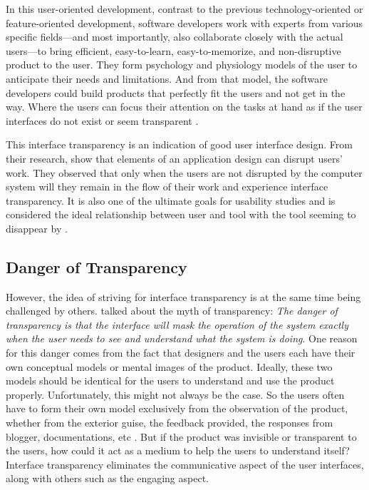 \documentclass{acm_proc_article-sp}
\begin{document}
In this user-oriented development, contrast to the previous
technology-oriented or feature-oriented development, software
developers work with experts from various specific fields---and most
importantly, also collaborate closely with the actual users---to bring
efficient, easy-to-learn, easy-to-memorize, and non-disruptive product
to the user. They form psychology and physiology models of the user to
anticipate their needs and limitations. And from that model, the
software developers could build products that perfectly fit the users
and not get in the way. Where the users can focus their attention on
the tasks at hand as if the user interfaces do not exist or seem
transparent \citep{computer:weiser}.

This interface transparency is an indication of good user interface
design. From their research, \citet{transparency:holtzblatt} show that
elements of an application design can disrupt users' work. They
observed that only when the users are not disrupted by the computer
system will they remain in the flow of their work and experience
interface transparency. It is also one of the ultimate goals for
usability studies and is considered the ideal relationship between
user and tool with the tool seeming to disappear by
\citet{transparency:rutkoski}.

\subsection{Danger of Transparency}
However, the idea of striving for interface transparency is at the
same time being challenged by others. \citet{windows:bolter} talked
about the myth of transparency: \textit{The danger of transparency is
  that the interface will mask the operation of the system exactly
  when the user needs to see and understand what the system is
  doing}. One reason for this danger comes from the fact that
designers and the users each have their own conceptual models or
mental images of the product. Ideally, these two models should be
identical for the users to understand and use the product
properly. Unfortunately, this might not always be the case. So the
users often have to form their own model exclusively from the
observation of the product, whether from the exterior guise, the
feedback provided, the responses from blogger, documentations, etc
\citet{design:norman}. But if the product was invisible or transparent
to the users, how could it act as a medium to help the users to
understand itself? Interface transparency eliminates the communicative
aspect of the user interfaces, along with others such as the engaging
aspect.
\end{document}
